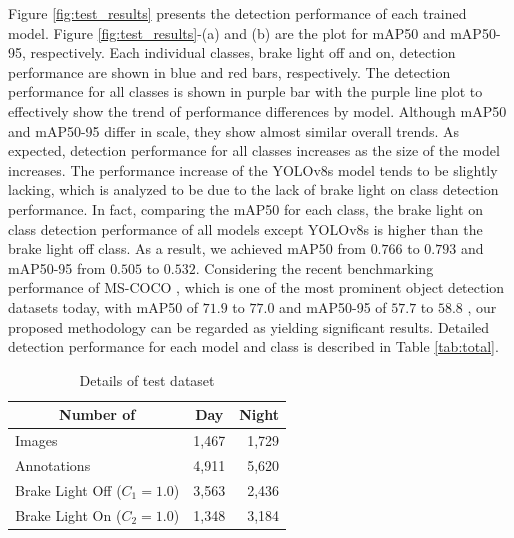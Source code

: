 Figure \ref{fig:test_results} presents the detection performance of each trained model.
Figure \ref{fig:test_results}-(a) and (b) are the plot for mAP50 and mAP50-95, respectively.
Each individual classes, brake light off and on, detection performance are shown in blue and red bars, respectively.
The detection performance for all classes is shown in purple bar with the purple line plot to effectively show the trend of performance differences by model.
Although mAP50 and mAP50-95 differ in scale, they show almost similar overall trends.
As expected, detection performance for all classes increases as the size of the model increases.
The performance increase of the YOLOv8s model tends to be slightly lacking, which is analyzed to be due to the lack of brake light on class detection performance.
In fact, comparing the mAP50 for each class, the brake light on class detection performance of all models except YOLOv8s is higher than the brake light off class.
As a result, we achieved mAP50 from $0.766$ to $0.793$ and mAP50-95 from $0.505$ to $0.532$.
Considering the recent benchmarking performance of MS-COCO \cite{lin2014microsoft}, which is one of the most prominent object detection datasets today, with mAP50 of $71.9$ to $77.0$ and mAP50-95 of $57.7$ to $58.8$ \cite{coco_benchmark, zou2023object}, our proposed methodology can be regarded as yielding significant results. Detailed detection performance for each model and class is described in Table \ref{tab:total}.

\begin{table}[h]
    \caption{Details of test dataset}
    \label{tab:test_dataset}
    \begin{tabular}{p{5cm} p{5cm} p{5cm}}
    \toprule
    \multicolumn{1}{c}{Number of}                          & \multicolumn{1}{c}{Day} & \multicolumn{1}{c}{Night} \\
    \midrule
    Images                              & \multicolumn{1}{r}{1,467}                     & \multicolumn{1}{r}{1,729}                    \\
    Annotations                         & \multicolumn{1}{r}{4,911}                    & \multicolumn{1}{r}{5,620}                   \\
    \multicolumn{1}{c}{Brake Light Off ($C_{1}=1.0$)} & \multicolumn{1}{r}{3,563}                    & \multicolumn{1}{r}{2,436}                    \\
    \multicolumn{1}{c}{Brake Light On ($C_{2}=1.0$)}  & \multicolumn{1}{r}{1,348}                     & \multicolumn{1}{r}{3,184}                   \\
    \bottomrule
    \end{tabular}%
\end{table}

